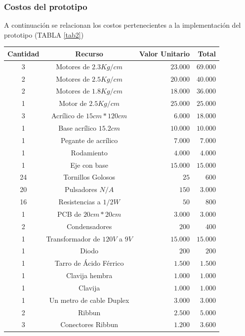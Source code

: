 \documentclass[twocolumn]{IEEEtran}
\begin{document}
\subsubsection{Costos del prototipo}
\noindent
A continuación se relacionan los costos pertenecientes a la implementación del prototipo (TABLA \ref{tab2})
\begin{table}[H]
	\centering
\begin{tabular}{|c|c|r|r|}\hline
 \textbf{Cantidad} & \textbf{Recurso} & \textbf{Valor Unitario} & \textbf{Total} \\ \hline
 3 & Motores de $2.3 Kg/cm$ & $23.000$ & $69.000$ \\ \hline
 2 & Motores de $2.5 Kg/cm$ & $20.000$ & $40.000$ \\ \hline
 2 & Motores de $1.8 Kg/cm$ & $18.000$ & $36.000$ \\ \hline
 1 & Motor de $2.5 Kg/cm$ & $25.000$ & $25.000$ \\ \hline
 3 & Acrílico de $15cm*120cm$ & $6.000$ & $18.000$ \\ \hline
 1 & Base acrílico $15.2 cm$ & $10.000$ & $10.000$ \\ \hline
 1 & Pegante de acrílico & $7.000$ & $7.000$ \\ \hline
 1 & Rodamiento & $4.000$ & $4.000$ \\ \hline
 1 & Eje con base & $15.000$ & $15.000$ \\ \hline
 24 & Tornillos Golosos & $25$ & $600$ \\ \hline %
 20 & Pulsadores $N/A$ & $150$ & $3.000$ \\ \hline
 16 & Resistencias a $1/2W$ & $50$ & $800$ \\ \hline
 1 & PCB de $20cm*20cm$ & $3.000$ & $3.000$ \\ \hline
 2 & Condensadores & $200$ & $400$ \\ \hline
 1 & Transformador de $120V$ a $9V$ & $15.000$ & $15.000$ \\ \hline
 1 & Diodo & $200$ & $200$ \\ \hline
 1 & Tarro de Ácido Férrico & $1.500$ & $1.500$ \\ \hline
 1 & Clavija hembra & $1.000$ & $1.000$ \\ \hline
 1 & Clavija & $1.000$ & $1.000$ \\ \hline
 1 & Un metro de cable Duplex & $3.000$ & $3.000$ \\ \hline
 2 & Ribbun & $2.500$ & $5.000$ \\ \hline
 3 & Conectores Ribbun & $1.200$ & $3.600$ \\ \hline

\end{tabular}
\end{table}
\end{document}
